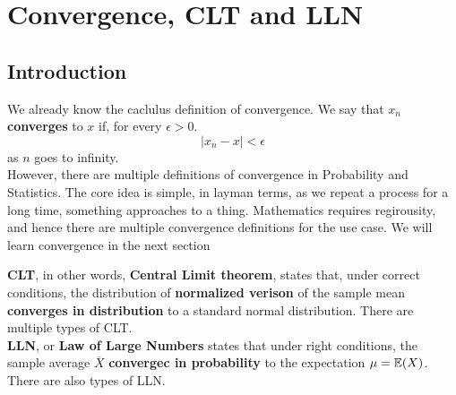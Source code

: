\chapter{Convergence, CLT and LLN}
\section{Introduction}
We already know the caclulus definition of convergence. We say that $x_n$ \textbf{converges} to $x$ if, for every $\epsilon > 0 $.
\[|x_n - x| < \epsilon \]
as $n$ goes to infinity.  \\
However, there are multiple definitions of convergence in Probability and Statistics. The core idea is simple, in layman terms, as we repeat a process for a long time, something approaches to a thing. Mathematics requires regirousity, and hence there are multiple convergence definitions for the use case. We will learn convergence in the next section \\
\par
\textbf{CLT}, in other words, \textbf{Central Limit theorem}, states that, under correct conditions, the distribution of \textbf{normalized verison} of the sample mean \textbf{converges in distribution} to a standard normal distribution. There are multiple types of CLT. \\

\textbf{LLN}, or \textbf{Law of Large Numbers} states that under right conditions,  the sample average $\overline{X}$ \textbf{convergec in probability}  to the expectation $\mu = {\mathbb{E}}(X)$. There are also types of LLN. 
